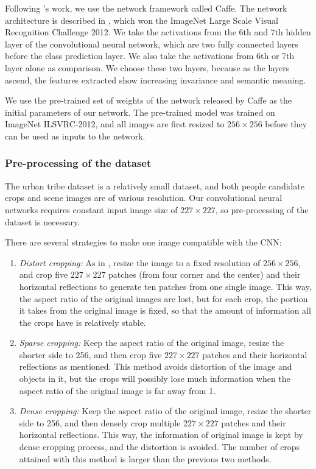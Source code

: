 \documentclass[10pt,twocolumn,letterpaper]{article}
\begin{document}
Following \cite{caffe}'s work, we use the network framework called Caffe. The network architecture is described in \cite{ImageNet}, which won the ImageNet Large Scale Visual Recognition Challenge 2012. We take the activations from the 6th and 7th hidden layer of the convolutional neural network, which are two fully connected layers before the class prediction layer. We also take the activations from 6th or 7th layer alone as comparison. We choose these two layers, because as the layers ascend, the features extracted show increasing invariance and semantic meaning. 

We use the pre-trained set of weights of the network released by Caffe as the initial parameters of our network. The pre-trained model was trained on ImageNet ILSVRC-2012, and all images are first resized to $256\times256$ before they can be used as inputs to the network.

\subsubsection{Pre-processing of the dataset}
\label{sectioncropping}
The urban tribe dataset is a relatively small dataset, and both people candidate crops and scene images are of various resolution. Our convolutional neural networks requires constant input image size of $227\times227$, so pre-processing of the dataset is necessary. 

There are several strategies to make one image compatible with the CNN:

\begin{enumerate}
\item \emph{Distort cropping:} As in \cite{ImageNet}, resize the image to a fixed resolution of $256\times256$, and crop five $227 \times 227$ patches (from four corner and the center) and their horizontal reflections to generate ten patches from one single image. This way, the aspect ratio of the original images are lost, but for each crop, the portion it takes from the original image is fixed, so that the amount of information all the crops have is relatively stable.
\item \emph{Sparse cropping:} Keep the aspect ratio of the original image, resize the shorter side to 256, and then crop five $227 \times 227$ patches and their horizontal reflections as mentioned. This method avoids distortion of the image and objects in it, but the crops will possibly lose much information when the aspect ratio of the original image is far away from 1.
\item  \emph{Dense cropping:} Keep the aspect ratio of the original image, resize the shorter side to 256, and then densely crop multiple  $227 \times 227$ patches and their horizontal reflections. This way, the information of original image is kept by dense cropping process, and the distortion is avoided. The number of crops attained with this method is larger than the previous two methods.
\end{enumerate}
\end{document}

